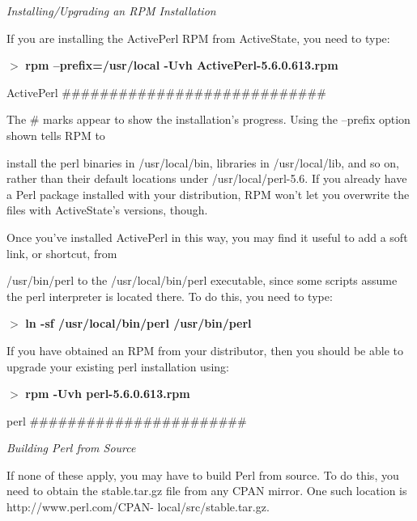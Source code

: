 \documentclass[a4paper,11pt]{book}
\begin{document}
\noindent 

\noindent \textit{Installing/Upgrading an RPM Installation}

\noindent If you are installing the ActivePerl RPM from ActiveState, you need to type:

\noindent 

\noindent $>$ \textbf{rpm --prefix=/usr/local -Uvh ActivePerl-5.6.0.613.rpm}

\noindent ActivePerl \#\#\#\#\#\#\#\#\#\#\#\#\#\#\#\#\#\#\#\#\#\#\#\#\#\#\#\#

\noindent 

\noindent 

\noindent The \# marks appear to show the installation's progress. Using the --prefix option shown tells RPM to

\noindent install the perl binaries in /usr/local/bin, libraries in /usr/local/lib, and so on, rather than their default locations under /usr/local/perl-5.6. If you already have a Perl package installed with your distribution, RPM won't let you overwrite the files with ActiveState's versions, though.

\noindent 

\noindent Once you've installed ActivePerl in this way, you may find it useful to add a soft link, or shortcut, from

\noindent /usr/bin/perl to the /usr/local/bin/perl executable, since some scripts assume the perl interpreter is located there. To do this, you need to type:

\noindent 

\noindent $>$ \textbf{ln -sf /usr/local/bin/perl /usr/bin/perl}

\noindent 

\noindent If you have obtained an RPM from your distributor, then you should be able to upgrade your existing perl installation using:

\noindent 

\noindent $>$ \textbf{rpm -Uvh perl-5.6.0.613.rpm}

\noindent perl \#\#\#\#\#\#\#\#\#\#\#\#\#\#\#\#\#\#\#\#\#\#\#

\noindent 

\noindent \textit{Building Perl from Source}

\noindent If none of these apply, you may have to build Perl from source. To do this, you need to obtain the stable.tar.gz file from any CPAN mirror. One such location is http://www.perl.com/CPAN- local/src/stable.tar.gz.
\end{document}
